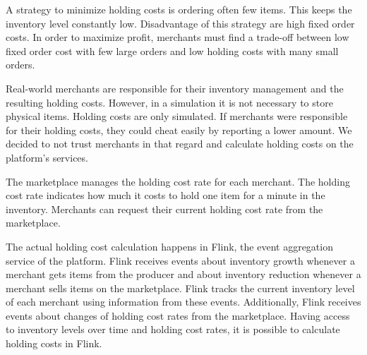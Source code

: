 A strategy to minimize holding costs is ordering often few items.
This keeps the inventory level constantly low.
Disadvantage of this strategy are high fixed order costs.
In order to maximize profit, merchants must find a trade-off between low fixed order cost with few large orders and low holding costs with many small orders.

Real-world merchants are responsible for their inventory management and the resulting holding costs.
However, in a \pricewars simulation it is not necessary to store physical items.
Holding costs are only simulated.
If merchants were responsible for their holding costs, they could cheat easily by reporting a lower amount.
We decided to not trust merchants in that regard and calculate holding costs on the platform's services.

The marketplace manages the holding cost rate for each merchant.
The holding cost rate indicates how much it costs to hold one item for a minute in the inventory.
Merchants can request their current holding cost rate from the marketplace.

The actual holding cost calculation happens in Flink, the event aggregation service of the \pricewars platform.
Flink receives events about inventory growth whenever a merchant gets items from the producer and about inventory reduction whenever a merchant sells items on the marketplace.
Flink tracks the current inventory level of each merchant using information from these events.
Additionally, Flink receives events about changes of holding cost rates from the marketplace.
Having access to inventory levels over time and holding cost rates, it is possible to calculate holding costs in Flink.

